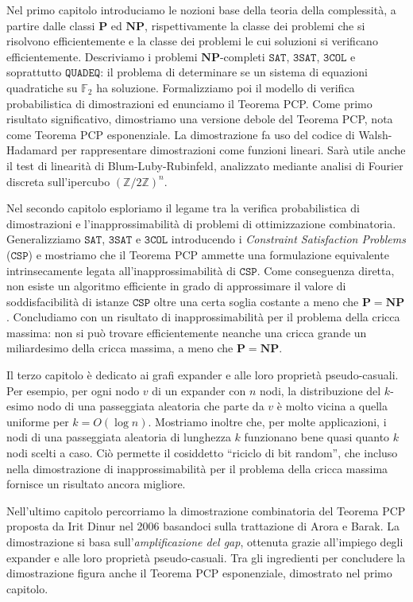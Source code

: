 \documentclass[11pt]{article}
\newcommand{\CSP}{\mathtt{CSP}\xspace}
\renewcommand{\P}{\mathbf{P}\xspace}
\newcommand{\NP}{\mathbf{NP}\xspace}
\newcommand{\F}{\mathbb{F}}
\begin{document}
Nel primo capitolo introduciamo le nozioni base della teoria della
complessità, a partire dalle classi $\P$ ed $\NP$, rispettivamente la classe
dei problemi che si risolvono efficientemente e la classe dei problemi le cui
soluzioni si verificano efficientemente.
Descriviamo i problemi $\NP$-completi $\mathtt{SAT}$, $\mathtt{3SAT}$,
$\mathtt{3COL}$ e soprattutto $\mathtt{QUADEQ}$: il problema di determinare se
un sistema di equazioni quadratiche su $\F_2$ ha soluzione.
Formalizziamo poi il modello di verifica probabilistica di dimostrazioni ed
enunciamo il Teorema PCP.
Come primo risultato significativo, dimostriamo una versione debole del
Teorema PCP, nota come Teorema PCP esponenziale.
La dimostrazione fa uso del codice di Walsh-Hadamard per rappresentare
dimostrazioni come funzioni lineari. Sarà utile anche il test di linearità di
Blum-Luby-Rubinfeld, analizzato mediante analisi di Fourier discreta
sull'ipercubo $(\mathbb{Z} / 2\mathbb{Z})^n$.

Nel secondo capitolo esploriamo il legame tra la verifica probabilistica
di dimostrazioni e l'inapprossimabilità di problemi di ottimizzazione
combinatoria. Generalizziamo $\mathtt{SAT}$, $\mathtt{3SAT}$ e $\mathtt{3COL}$
introducendo i \emph{Constraint Satisfaction Problems} ($\mathtt{CSP}$) e
mostriamo che il Teorema PCP ammette una formulazione equivalente
intrinsecamente legata all'inapprossimabilità di $\CSP$.
Come conseguenza diretta, non esiste un algoritmo efficiente in grado di
approssimare il valore di soddisfacibilità di istanze $\CSP$ oltre una certa
soglia costante a meno che $\P = \NP$.
Concludiamo con un risultato di inapprossimabilità per il problema della
cricca massima: non si può trovare efficientemente neanche una cricca grande
un miliardesimo della cricca massima, a meno che $\P = \NP$.

Il terzo capitolo è dedicato ai grafi expander e alle loro proprietà
pseudo-casuali. Per esempio, per ogni nodo $v$ di un expander con $n$ nodi,
la distribuzione del $k$-esimo nodo di una passeggiata aleatoria che parte da
$v$ è molto vicina a quella uniforme per $k = O(\log n)$.
Mostriamo inoltre che, per molte applicazioni, i nodi di una passeggiata
aleatoria di lunghezza $k$ funzionano bene quasi quanto $k$ nodi scelti a caso.
Ciò permette il cosiddetto ``riciclo di bit random'', che incluso nella
dimostrazione di inapprossimabilità per il problema della cricca massima
fornisce un risultato ancora migliore.

Nell'ultimo capitolo percorriamo la dimostrazione combinatoria
del Teorema PCP proposta da Irit Dinur nel 2006 basandoci sulla trattazione di
Arora e Barak.
La dimostrazione si basa sull'\emph{amplificazione del gap}, ottenuta grazie
all'impiego degli expander e alle loro proprietà pseudo-casuali.
Tra gli ingredienti per concludere la dimostrazione figura anche il Teorema PCP
esponenziale, dimostrato nel primo capitolo.
\end{document}
